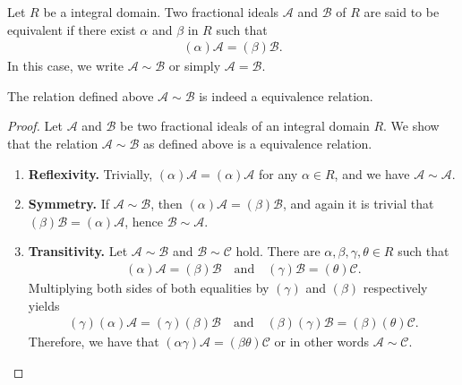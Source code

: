 \begin{defbox}
    \begin{definition}
        Let \(R\) be a integral domain. Two fractional ideals \(\mathcal{A}\) and \(\mathcal{B}\) of \(R\) are said to be equivalent if there exist \(\alpha\) and \(\beta\) in \(R\) such that
        \begin{align*}
            (\alpha) \mathcal{A} = (\beta) \mathcal{B} \text{.}
        \end{align*}
        In this case, we write \(\mathcal{A} \sim \mathcal{B}\) or simply \(\mathcal{A} = \mathcal{B}\).
    \end{definition}
\end{defbox}
\begin{thmbox}
    \begin{proposition}
        The relation defined above \(\mathcal{A} \sim \mathcal{B}\) is indeed a equivalence relation.
    \end{proposition}
\end{thmbox}
\begin{proof}
    Let \(\mathcal{A}\) and \(\mathcal{B}\) be two fractional ideals of an integral domain \(R\). We show that the relation \(\mathcal{A} \sim \mathcal{B}\) as defined above is a equivalence relation.
    \begin{enumerate}
        \item \textbf{Reflexivity.} Trivially, \((\alpha) \mathcal{A} = (\alpha) \mathcal{A}\) for any \(\alpha \in R\), and we have \(\mathcal{A} \sim \mathcal{A}\).
        \item \textbf{Symmetry.} If \(\mathcal{A} \sim \mathcal{B}\), then \((\alpha) \mathcal{A} = (\beta) \mathcal{B}\), and again it is trivial that \((\beta) \mathcal{B} = (\alpha) \mathcal{A}\), hence \(\mathcal{B} \sim \mathcal{A}\).
        \item \textbf{Transitivity.} Let \(\mathcal{A} \sim \mathcal{B}\) and \(\mathcal{B} \sim \mathcal{C}\) hold. There are \(\alpha, \beta, \gamma, \theta \in R\) such that
        \begin{align*}
            (\alpha) \mathcal{A} = (\beta) \mathcal{B} \quad \text{and} \quad (\gamma) \mathcal{B} = (\theta) \mathcal{C} \text{.}
        \end{align*}
        Multiplying both sides of both equalities by \((\gamma)\) and \((\beta)\) respectively yields
        \begin{align*}
            (\gamma) (\alpha) \mathcal{A} = (\gamma) (\beta) \mathcal{B} \quad \text{and} \quad (\beta)(\gamma) \mathcal{B} = (\beta)(\theta) \mathcal{C} \text{.}
        \end{align*}
        Therefore, we have that \((\alpha \gamma) \mathcal{A} = (\beta \theta) \mathcal{C}\) or in other words \(\mathcal{A} \sim \mathcal{C}\).
    \end{enumerate}
\end{proof}

